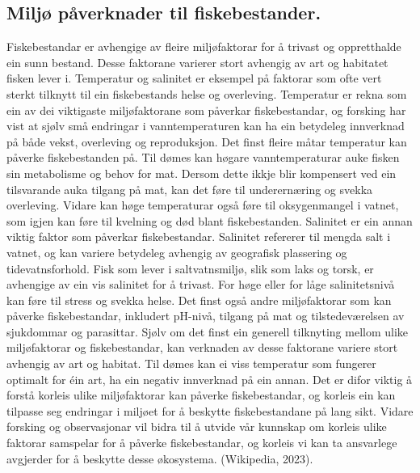\documentclass{report}
\begin{document}
\subsection{Miljø påverknader til fiskebestander.}
Fiskebestandar er avhengige av fleire miljøfaktorar for å trivast og oppretthalde ein sunn bestand. Desse faktorane varierer stort avhengig av art og habitatet fisken lever i. Temperatur og salinitet er eksempel på faktorar som ofte vert sterkt tilknytt til ein fiskebestands helse og overleving.
Temperatur er rekna som ein av dei viktigaste miljøfaktorane som påverkar fiskebestandar, og forsking har vist at sjølv små endringar i vanntemperaturen kan ha ein betydeleg innverknad på både vekst, overleving og reproduksjon. Det finst fleire måtar temperatur kan påverke fiskebestanden på. Til dømes kan høgare vanntemperaturar auke fisken sin metabolisme og behov for mat. Dersom dette ikkje blir kompensert ved ein tilsvarande auka tilgang på mat, kan det føre til underernæring og svekka overleving. Vidare kan høge temperaturar også føre til oksygenmangel i vatnet, som igjen kan føre til kvelning og død blant fiskebestanden.
Salinitet er ein annan viktig faktor som påverkar fiskebestandar. Salinitet refererer til mengda salt i vatnet, og kan variere betydeleg avhengig av geografisk plassering og tidevatnsforhold. Fisk som lever i saltvatnsmiljø, slik som laks og torsk, er avhengige av ein vis salinitet for å trivast. For høge eller for låge salinitetsnivå kan føre til stress og svekka helse.
Det finst også andre miljøfaktorar som kan påverke fiskebestandar, inkludert pH-nivå, tilgang på mat og tilstedeværelsen av sjukdommar og parasittar. Sjølv om det finst ein generell tilknyting mellom ulike miljøfaktorar og fiskebestandar, kan verknaden av desse faktorane variere stort avhengig av art og habitat. Til dømes kan ei viss temperatur som fungerer optimalt for éin art, ha ein negativ innverknad på ein annan.
Det er difor viktig å forstå korleis ulike miljøfaktorar kan påverke fiskebestandar, og korleis ein kan tilpasse seg endringar i miljøet for å beskytte fiskebestandane på lang sikt. Vidare forsking og observasjonar vil bidra til å utvide vår kunnskap om korleis ulike faktorar samspelar for å påverke fiskebestandar, og korleis vi kan ta ansvarlege avgjerder for å beskytte desse økosystema.
(Wikipedia, 2023). 
\end{document}
